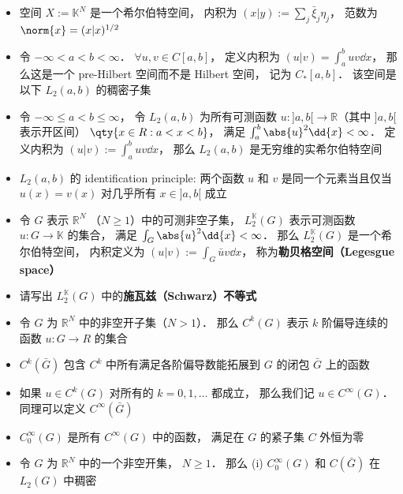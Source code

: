\begin{itemize}
\item 空间 $X := \mathbb K^N$ 是一个希尔伯特空间， 内积为 $(x|y) := \sum_j \bar \xi_j \eta_j$， 范数为 $\norm{x} = (x|x)^{1/2}$

\item 令 $-\infty < a < b < \infty$． $\forall u, v\in C[a, b]$， 定义内积为 $(u|v)=\int_a^b uv\dd{x}$， 那么这是一个 pre-Hilbert 空间而不是 Hilbert 空间， 记为 $C_*[a, b]$． 该空间是以下 $L_2(a, b)$ 的稠密子集

\item 令 $-\infty \leqslant a < b \leqslant \infty$， 令 $L_2(a, b)$ 为所有可测函数 $u :]a, b[ \to \mathbb R$（其中 $]a, b[$ 表示开区间） $\qty{x \in R : a < x < b}$， 满足 $\int_a^b \abs{u}^2 \dd{x} < \infty$． 定义内积为 $(u|v) := \int_a^b uv \dd{x}$， 那么 $L_2(a, b)$ 是无穷维的实希尔伯特空间

\item $L_2(a, b)$ 的 identification principle: 两个函数 $u$ 和 $v$ 是同一个元素当且仅当 $u(x) = v(x)$ 对几乎所有 $x \in ]a, b[$ 成立

\item 令 $G$ 表示 $\mathbb R^N$ （$N \geqslant 1$）中的可测非空子集， $L_2^{\mathbb K}(G)$ 表示可测函数 $u: G \to \mathbb K$ 的集合， 满足 $\int_G \abs{u}^2 \dd{x} < \infty$． 那么 $L_2^{\mathbb K}(G)$ 是一个希尔伯特空间， 内积定义为 $(u|v) := \int_G \bar u v \dd{x}$， 称为\textbf{勒贝格空间（Legesgue space）}

\item 请写出 $L_2^{\mathbb K}(G)$ 中的\textbf{施瓦兹（Schwarz）不等式}

\item 令 $G$ 为 $\mathbb R^N$ 中的非空开子集（$N > 1$）． 那么 $C^k(G)$ 表示 $k$ 阶偏导连续的函数 $u: G \to R$ 的集合

\item $C^k(\bar G)$ 包含 $C^k$ 中所有满足各阶偏导数能拓展到 $G$ 的闭包 $\bar G$ 上的函数

\item 如果 $u \in C^k(G)$ 对所有的 $k = 0, 1, \dots$ 都成立， 那么我们记 $u \in C^\infty(G)$． 同理可以定义 $C^\infty(\bar G)$

\item $C_0^\infty (G)$ 是所有 $C^\infty(G)$ 中的函数， 满足在 $G$ 的紧子集 $C$ 外恒为零

\item 令 $G$ 为 $\mathbb R^N$ 中的一个非空开集， $N \geqslant 1$． 那么 (i) $C_0^\infty(G)$ 和 $C(\bar G)$ 在 $L_2(G)$ 中稠密


\end{itemize}
